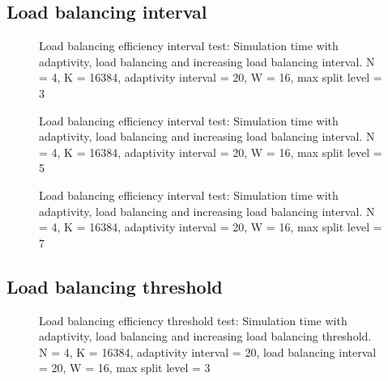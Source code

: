 
\subsection{Load balancing interval}\label{subsection:results:load_balancing_performance:interval}

\begin{figure}[H]
	\centering
	
	\caption{Load balancing efficiency interval test: Simulation time with adaptivity, load balancing and increasing load balancing interval. N = 4, K = 16384, adaptivity interval = 20, W = 16, max split level = 3}\label{fig:load_balancing_efficiency_interval}
\end{figure}

\begin{figure}[H]
	\centering
	
	\caption{Load balancing efficiency interval test: Simulation time with adaptivity, load balancing and increasing load balancing interval. N = 4, K = 16384, adaptivity interval = 20, W = 16, max split level = 5}\label{fig:load_balancing_efficiency_interval_s5}
\end{figure}

\begin{figure}[H]
	\centering
	
	\caption{Load balancing efficiency interval test: Simulation time with adaptivity, load balancing and increasing load balancing interval. N = 4, K = 16384, adaptivity interval = 20, W = 16, max split level = 7}\label{fig:load_balancing_efficiency_interval_s7}
\end{figure}


\subsection{Load balancing threshold}\label{subsection:results:load_balancing_performance:threshold}

\begin{figure}[H]
	\centering
	
	\caption{Load balancing efficiency threshold test: Simulation time with adaptivity, load balancing and increasing load balancing threshold. N = 4, K = 16384, adaptivity interval = 20, load balancing interval = 20, W = 16, max split level = 3}\label{fig:load_balancing_efficiency_threshold_s3}
\end{figure}

